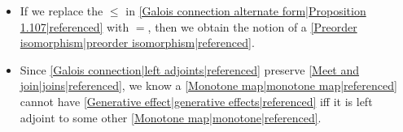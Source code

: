 \begin{itemize}
    \item If we replace the $\leq$ in \ref{Galois connection alternate form|Proposition 1.107|referenced} with $=$, then we obtain the notion of a \ref{Preorder isomorphism|preorder isomorphism|referenced}.
    \item Since \ref{Galois connection|left adjoints|referenced} preserve \ref{Meet and join|joins|referenced}, we know a \ref{Monotone map|monotone map|referenced} cannot have \ref{Generative effect|generative effects|referenced} iff it is left adjoint to some other \ref{Monotone map|monotone|referenced}.
  \end{itemize}
